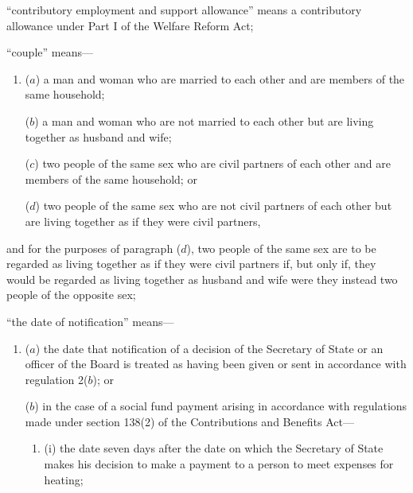\documentclass[12pt,a4paper]{article}
\begin{document}
\begin{enumerate}


“contributory employment and support allowance” means a contributory allowance under Part I of the Welfare Reform Act;

“couple” means—
\begin{enumerate}\item[]
($a$) 
a man and woman who are married to each other and are members of the same household;

($b$) 
a man and woman who are not married to each other but are living together as husband and wife;

($c$) 
two people of the same sex who are civil partners of each other and are members of the same household; or

($d$) 
two people of the same sex who are not civil partners of each other but are living together as if they were civil partners,
\end{enumerate}
and for the purposes of paragraph ($d$), two people of the same sex are to be regarded as living together as if they were civil partners if, but only if, they would be regarded as living together as husband and wife were they instead two people of the opposite sex; 

“the date of notification” means—
\begin{enumerate}\item[]
($a$) the date that notification of a decision of the Secretary of State 
or an officer of the Board  %
is treated as having been given or sent in accordance with regulation 2($b$); or

($b$) in the case of a social fund payment arising in accordance with regulations made under section 138(2) of the Contributions and Benefits Act—
\begin{enumerate}\item[]
(i) the date seven days after the date on which the Secretary of State makes his decision to make a payment to a person to meet expenses for heating;


\end{enumerate}
\end{enumerate}
\end{enumerate}
\end{document}
